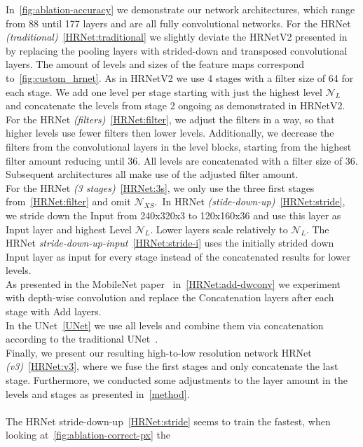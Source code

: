In~\ref{fig:ablation-accuracy} we demonstrate our network architectures, which range from 88 until 177 layers and are
all fully convolutional networks.
For the HRNet \textit{(traditional)}~\ref{HRNet:traditional} we slightly deviate the HRNetV2 presented in~\cite{HRNetv2} by replacing the pooling
layers with strided-down and transposed convolutional layers.
The amount of levels and sizes of the feature maps correspond to~\ref{fig:custom_hrnet}.
As in HRNetV2 we use 4 stages with a filter size of 64 for each stage.
We add one level per stage starting with just the highest level $\mathcal{N}_L$
and concatenate the levels from stage 2 ongoing as demonstrated in HRNetV2.\\
For the HRNet \textit{(filters)}~\ref{HRNet:filter}, we adjust the filters in a way, so that higher levels use fewer filters then lower levels.
Additionally, we decrease the filters from the convolutional layers in the level blocks, starting from the highest filter
amount reducing until 36.
All levels are concatenated with a filter size of 36.\\
Subsequent architectures all make use of the adjusted filter amount.\\
For the HRNet \textit{(3 stages)}~\ref{HRNet:3s}, we only use the three first stages from~\ref{HRNet:filter} and omit
$\mathcal{N}_{XS}$.\
In HRNet \textit{(stide-down-up)}~\ref{HRNet:stride}, we stride down the Input from 240x320x3 to 120x160x36 and use this layer as Input layer
and highest Level $\mathcal{N}_L$. Lower layers scale relatively to $\mathcal{N}_L$.
The HRNet \textit{stride-down-up-input}~\ref{HRNet:stride-i} uses the initially strided down Input layer as input for
every stage instead of the concatenated results for lower levels.\\
As presented in the MobileNet paper~\cite{mobilenet} in~\ref{HRNet:add-dwconv} we experiment with depth-wise convolution
and replace the Concatenation layers after each stage with Add layers.\\
In the UNet~\ref{UNet} we use all levels and combine them via concatenation according to the traditional UNet~\cite{unet}.\\
Finally, we present our resulting high-to-low resolution network HRNet \textit{(v3)}~\ref{HRNet:v3}, where we fuse
the first stages and only concatenate the last stage. Furthermore, we conducted some adjustments to the layer amount
in the levels and stages as presented in~\autoref{method}.
\\\mbox{}\\
The HRNet stride-down-up~\ref{HRNet:stride} seems to train the fastest, when looking at~\ref{fig:ablation-correct-px} the

